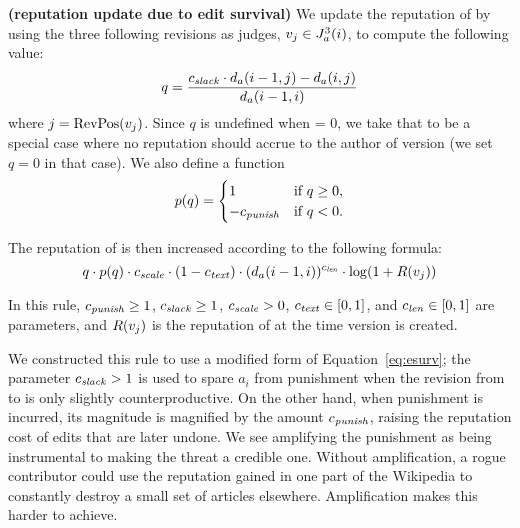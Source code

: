 \begin{regola}
\textbf{(reputation update due to edit survival)}
\label{rule-edit}
  We update the reputation of  by
  using the three following revisions as judges,
  $v_j \in J_{a}^{3}(i)$, to compute the following value:
\begin{equation*}
q = \frac{\slack \cdot \dist{a}{i-1,j} - \dist{a}{i,j}}
                        {\dist{a}{i-1,i}}
\label{eq-edit-long}
\end{equation*}
where $j = \mathrm{RevPos}(v_{j})$.
Since $q$ is undefined when  = 0,
we take that to be a special case where no reputation
should accrue to the author of version 
(\ie we set $q = 0$ in that case).
We also define a  function
\begin{equation*}
    p(q) =
        \begin{cases}
            1 & \text{if $q \ge 0$,} \\
            -{c_{{\text{\textit{punish}}}}} & \text{if $q < 0$.} \\
        \end{cases}
\end{equation*}

The reputation of  is then increased
according to the following formula:
\begin{equation*}
q \cdot p(q)
  \cdot {c_{{\text{\textit{scale}}}}} \cdot (1 - {c_{{\text{\textit{text}}}}}) \cdot
        (d_{a}(i-1,i))^{c_{{\text{\textit{len}}}}} \cdot \log(1 + R(v_{j}))
\end{equation*}

  In this rule, ${c_{{\text{\textit{punish}}}}} \geq 1$, ${c_{{\text{\textit{slack}}}}} \geq 1$, ${c_{{\text{\textit{scale}}}}} > 0$,
  ${c_{{\text{\textit{text}}}}} \in [0,1]$, and ${c_{{\text{\textit{len}}}}} \in [0,1]$ are parameters,
  and $R(v_{j})$ is the reputation of 
  at the time version  is created.
\end{regola}

We constructed this rule to use a modified form of
Equation~\ref{eq:esurv};
the parameter ${c_{{\text{\textit{slack}}}}} > 1$ is used to spare $a_i$ from punishment when
the revision from  to  is only slightly
counterproductive.
On the other hand, when punishment is incurred, its magnitude is
magnified by the amount ${c_{{\text{\textit{punish}}}}}$, raising the reputation cost of
edits that are later undone.
We see amplifying the punishment as being instrumental
to making the threat a credible one.
Without amplification, a rogue contributor could use the reputation
gained in one part of the Wikipedia to constantly destroy a small set
of articles elsewhere.
Amplification makes this harder to achieve.

